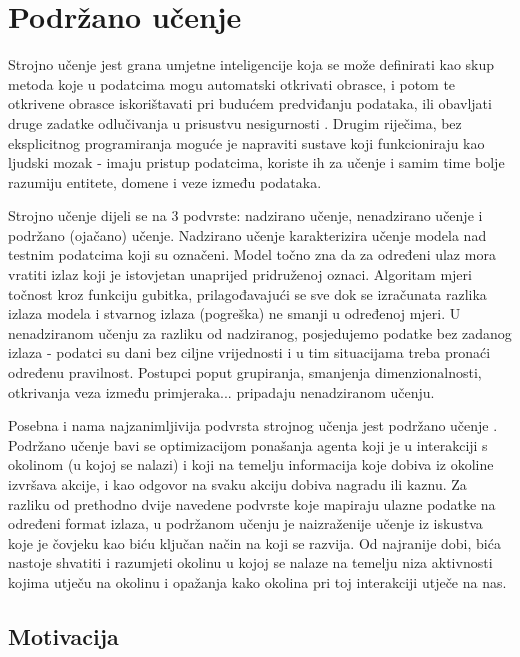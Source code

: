 \chapter{Podržano učenje}

Strojno učenje  jest grana umjetne inteligencije  koja se može definirati kao skup metoda koje u podatcima mogu automatski otkrivati obrasce, i potom te otkrivene obrasce iskorištavati pri budućem predviđanju podataka, ili obavljati druge zadatke odlučivanja u prisustvu nesigurnosti \cite{CupicUvod}. Drugim riječima, bez eksplicitnog programiranja moguće je napraviti sustave koji funkcioniraju kao ljudski mozak - imaju pristup podatcima, koriste ih za učenje i samim time bolje razumiju entitete, domene i veze između podataka. 

Strojno učenje dijeli se na 3 podvrste: nadzirano učenje, nenadzirano učenje i podržano (ojačano) učenje. Nadzirano učenje  karakterizira učenje modela nad testnim podatcima koji su označeni. Model točno zna da za određeni ulaz mora vratiti izlaz koji je istovjetan unaprijed pridruženoj oznaci. Algoritam mjeri točnost kroz funkciju gubitka, prilagođavajući se sve dok se izračunata razlika izlaza modela i stvarnog izlaza (pogreška) ne smanji u određenoj mjeri. U nenadziranom učenju  za razliku od nadziranog, posjedujemo podatke bez zadanog izlaza - podatci su dani bez ciljne vrijednosti i u tim situacijama treba pronaći određenu pravilnost. Postupci poput grupiranja, smanjenja dimenzionalnosti, otkrivanja veza između primjeraka... pripadaju nenadziranom učenju.

Posebna i nama najzanimljivija podvrsta strojnog učenja jest podržano učenje . Podržano učenje bavi se optimizacijom ponašanja agenta koji je u interakciji s okolinom (u kojoj se nalazi) i koji na temelju informacija koje dobiva iz okoline izvršava akcije, i kao odgovor na svaku akciju dobiva nagradu ili kaznu. Za razliku od prethodno dvije navedene podvrste koje mapiraju ulazne podatke na određeni format izlaza, u podržanom učenju je naizraženije učenje iz iskustva koje je čovjeku kao biću ključan način na koji se razvija. Od najranije dobi, bića nastoje shvatiti i razumjeti okolinu u kojoj se nalaze na temelju niza aktivnosti kojima utječu na okolinu i opažanja kako okolina pri toj interakciji utječe na nas. 

\section{Motivacija}

